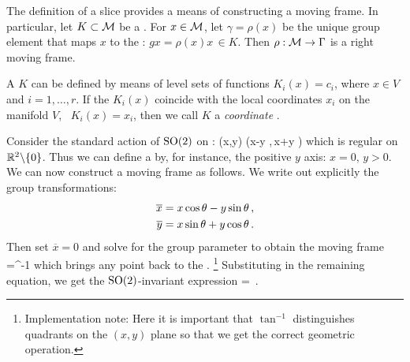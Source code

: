 The definition of a slice provides a means of constructing a moving frame.
In particular, let $K\subset\mathcal{M}$ be a {\csection}. For $x\in \mathcal{M}$, let
$\gamma=\rho(x)$ be the unique group element that maps $x$
to the {\csection}: $g x = \rho(x) x\, \in K$. Then
$\rho:\mathcal{M}\rightarrow \Gamma$ is a right moving frame.

A {\csection} $K$ can be defined by means of level sets of
functions $K_i(x)=c_i$, where $x\in V$ and $i=1,\ldots,r$. If
the $K_i(x)$ coincide with the local coordinates $x_i$ on the
manifold $V$, \ie~$K_i(x)=x_i$, then we call $K$ a
\emph{coordinate \csection}.

\begin{example}
Consider the standard action of $\textrm{SO}(2)$ on :
\beq
	(x,y) \mapsto (x\cos\theta -y \sin\theta,\,x\sin\theta +y \cos\theta )
\eeq
which is regular on $\mathbb{R}^{2}\backslash\{0\}$. Thus we can define
a {\csection} by, for instance, the
positive $y$ axis: $x=0,\,y>0$.
We can now construct a moving frame as follows. We write out
explicitly the group transformations:
\begin{subequations}
\begin{align}
 	\overline{x} &= x \cos\theta - y \sin\theta\label{eq:explSO2stnd1}\,, \\ 
	\overline{y} &= x \sin\theta + y \cos\theta\label{eq:explSO2stnd2}\,.
\end{align}
\end{subequations}
Then set $\overline{x}=0$ and solve  for the group
parameter to obtain the moving frame
\beq
	\theta=\tan^{-1}
	\label{eq:SO2stndMF}
\eeq
which brings any point  back to the {\csection}.
\footnote{Implementation note: Here it is important that
$\tan^{-1}$ distinguishes quadrants on the $(x,y)$ plane so
that we get the correct geometric operation.}
Substituting  in the remaining equation,
we get the $\textrm{SO}(2)$-invariant expression
\beq
	 = \,.
\eeq
\end{example}

